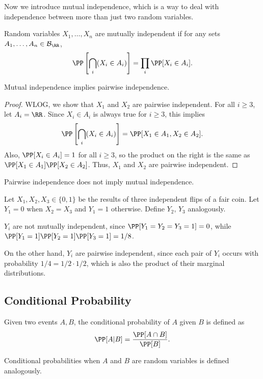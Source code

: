 Now we introduce mutual independence, which is a way to deal with independence between more than just two random variables. 

\begin{definition}

Random variables $X_1, \hdots, X_n$ are \ac{mutually independent} if for any sets $A_1, \hdots, A_n\in \mathcal{B}_{\RR}$, 
\[\PP\left[\bigcap_i(X_i\in A_i)\right] = \prod_{i}\PP[X_i\in A_i].\]
\end{definition}

\begin{example}
\exlabel

Mutual independence implies pairwise independence.
\end{example}

\begin{proof}
WLOG, we show that $X_1$ and $X_2$ are pairwise independent. For all $i\geq 3$, let $A_i = \RR$. Since $X_i\in A_i$ is always true for $i\geq 3$, this implies 
\[\PP\left[\bigcap_i(X_i\in A_i)\right] = \PP[X_1\in A_1, X_2\in A_2].\]
Also, $\PP[X_i\in A_i]=1$ for all $i\geq 3$, so the product on the right is the same as $\PP[X_1\in A_1]\PP[X_2\in A_2]$. Thus, $X_1$ and $X_2$ are pairwise independent.
\end{proof}

\begin{example}
\exlabel

Pairwise independence does not imply mutual independence. 
\end{example}

Let $X_1, X_2, X_3\in \{0,1\}$ be the results of three independent flips of a fair coin. Let $Y_1=0$ when $X_2=X_3$ and $Y_1=1$ otherwise. Define $Y_2$, $Y_3$ analogously. 

$Y_i$ are not mutually independent, since $\PP[Y_1=Y_2=Y_3=1] = 0$, while $\PP[Y_1=1]\PP[Y_2=1]\PP[Y_3=1] = 1/8$. 

On the other hand, $Y_i$ are pairwise independent, since each pair of $Y_i$ occurs with probability $1/4 = 1/2\cdot 1/2$, which is also the product of their marginal distributions. 

\subsection{Conditional Probability}

\begin{definition}

Given two events $A,B$, the conditional probability of $A$ given $B$ is defined as
\[\PP[A | B] = \frac{\PP[A\cap B]}{\PP[B]}.\]

Conditional probabilities when $A$ and $B$ are random variables is defined analogously. 
\end{definition}

